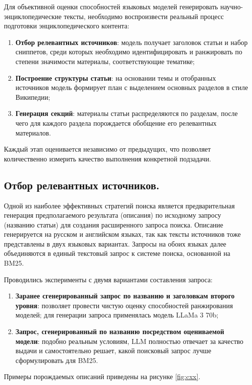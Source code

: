 \documentclass{article}
\begin{document}
Для объективной оценки способностей языковых моделей генерировать научно-энциклопедические тексты, необходимо воспроизвести реальный процесс подготовки энциклопедического контента:
\begin{enumerate}

    \item \textbf{Отбор релевантных источников}: модель получает заголовок статьи и набор сниппетов, среди которых необходимо идентифицировать и ранжировать по степени значимости материалы, соответствующие тематике; 
    
    \item \textbf{Построение структуры статьи}: на основании темы и отобранных источников модель формирует план с выделением основных разделов в стиле Википедии;
    
    \item \textbf{Генерация секций}: материалы статьи распределяются по разделам, после чего для каждого раздела порождается обобщение его релевантных материалов.

\end{enumerate}
Каждый этап оценивается независимо от предыдущих, что позволяет количественно измерить качество выполнения конкретной подзадачи. 
\subsection*{Отбор релевантных источников.}
Одной из наиболее эффективных стратегий поиска \cite{rerank} является предварительная генерация предполагаемого результата (описания) по исходному запросу (названию статьи) для создания расширенного запроса поиска.
Описание генерируется на русском и английском языках, так как тексты источников тоже представлены в двух языковых вариантах. 
Запросы на обоих языках далее объединяются в единый текстовый запрос к системе поиска, основанной на BM25. 

Проводились эксперименты с двумя вариантами составления запроса:
\begin{enumerate}

    \item \textbf{Заранее сгенерированный запрос по названию и заголовкам второго уровня}: позволяет провести чистую оценку способностей ранжирования моделей; для генерации запроса применялась модель LLaMa 3 70b;
    
    \item \textbf{Запрос, сгенерированный по названию посредством оцениваемой модели}: подобно реальным условиям, LLM полностью отвечает за качество выдачи и самостоятельно решает, какой поисковый запрос лучше сформулировать для BM25.

\end{enumerate}
Примеры порождаемых описаний приведены на рисунке \ref{fig:cxx}.
\end{document}
